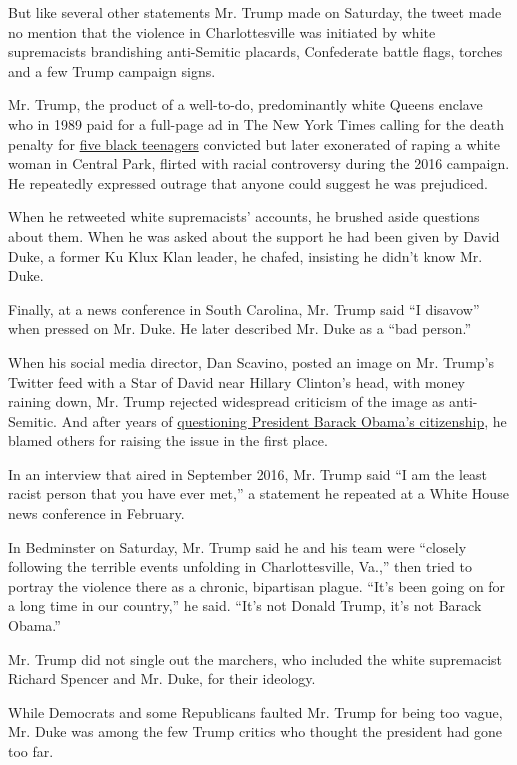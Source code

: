 But like several other statements Mr. Trump made on Saturday, the tweet
made no mention that the violence in Charlottesville was initiated by
white supremacists brandishing anti-Semitic placards, Confederate battle
flags, torches and a few Trump campaign signs.

Mr. Trump, the product of a well-to-do, predominantly white Queens
enclave who in 1989 paid for a full-page ad in The New York Times
calling for the death penalty for
\href{https://www.nytimes.com/2016/10/18/opinion/why-trump-doubled-down-on-the-central-park-five.html}{five
black teenagers} convicted but later exonerated of raping a white woman
in Central Park, flirted with racial controversy during the 2016
campaign. He repeatedly expressed outrage that anyone could suggest he
was prejudiced.

When he retweeted white supremacists' accounts, he brushed aside
questions about them. When he was asked about the support he had been
given by David Duke, a former Ku Klux Klan leader, he chafed, insisting
he didn't know Mr. Duke.

Finally, at a news conference in South Carolina, Mr. Trump said ``I
disavow'' when pressed on Mr. Duke. He later described Mr. Duke as a
``bad person.''

When his social media director, Dan Scavino, posted an image on Mr.
Trump's Twitter feed with a Star of David near Hillary Clinton's head,
with money raining down, Mr. Trump rejected widespread criticism of the
image as anti-Semitic. And after years of
\href{https://twitter.com/i/moments/776795610817007616?lang=en}{questioning
President Barack Obama's citizenship}, he blamed others for raising the
issue in the first place.

In an interview that aired in September 2016, Mr. Trump said ``I am the
least racist person that you have ever met,'' a statement he repeated at
a White House news conference in February.

In Bedminster on Saturday, Mr. Trump said he and his team were ``closely
following the terrible events unfolding in Charlottesville, Va.,'' then
tried to portray the violence there as a chronic, bipartisan plague.
``It's been going on for a long time in our country,'' he said. ``It's
not Donald Trump, it's not Barack Obama.''

Mr. Trump did not single out the marchers, who included the white
supremacist Richard Spencer and Mr. Duke, for their ideology.

While Democrats and some Republicans faulted Mr. Trump for being too
vague, Mr. Duke was among the few Trump critics who thought the
president had gone too far.

